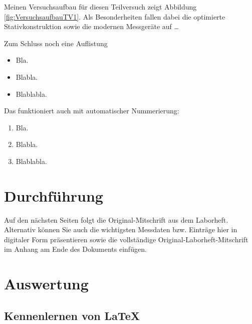 \documentclass[a4paper,10pt]{report}
\begin{document}
	Meinen Versuchsaufbau für diesen Teilversuch zeigt Abbildung \ref{fig:VersuchsaufbauTV1}. Als Besonderheiten fallen dabei die optimierte Stativkonstruktion sowie die modernen Messgeräte auf \dots

	Zum Schluss noch eine Auflistung
	\begin{itemize}
		\item Bla.
		\item Blabla.
		\item Blablabla.
	\end{itemize} 
	Das funktioniert auch mit automatischer Nummerierung:
	\begin{enumerate}
		\item Bla.
		\item Blabla.
		\item Blablabla.
	\end{enumerate}
	
	\chapter{Durchführung}
	
	Auf den nächsten Seiten folgt die Original-Mitschrift aus dem Laborheft.
	Alternativ können Sie auch die wichtigsten Messdaten bzw. Einträge hier in
	digitaler Form präsentieren sowie die vollständige Original-Laborheft-Mitschrift
	im Anhang am Ende des Dokuments einfügen.
	
	
	
	\chapter{Auswertung}
	
	\section{Kennenlernen von \LaTeX}
	
	\label{sec:Teilversuch1Auswertung}
	
\end{document}
